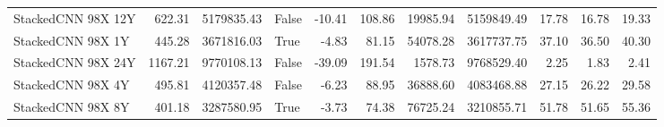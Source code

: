 \begin{tabular}{lrrlrrrrrrr}
StackedCNN 98X 12Y & 622.31 & 5179835.43 & False & -10.41 & 108.86 & 19985.94 & 5159849.49 & 17.78 & 16.78 & 19.33 \\
StackedCNN 98X 1Y & 445.28 & 3671816.03 & True & -4.83 & 81.15 & 54078.28 & 3617737.75 & 37.10 & 36.50 & 40.30 \\
StackedCNN 98X 24Y & 1167.21 & 9770108.13 & False & -39.09 & 191.54 & 1578.73 & 9768529.40 & 2.25 & 1.83 & 2.41 \\
StackedCNN 98X 4Y & 495.81 & 4120357.48 & False & -6.23 & 88.95 & 36888.60 & 4083468.88 & 27.15 & 26.22 & 29.58 \\
StackedCNN 98X 8Y & 401.18 & 3287580.95 & True & -3.73 & 74.38 & 76725.24 & 3210855.71 & 51.78 & 51.65 & 55.36 \\
\bottomrule
\end{tabular}
